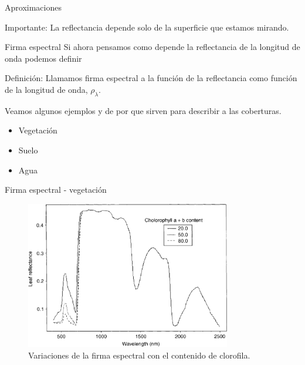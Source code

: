 \documentclass[handout]{beamer}
\begin{document}
\begin{frame}{Aproximaciones}
  \begin{alertblock}{Importante:}
    La reflectancia depende solo de la superficie que estamos mirando.
  \end{alertblock}
\end{frame}

\begin{frame}{Firma espectral}
  Si ahora pensamos como depende la reflectancia de la longitud de onda podemos definir
  \begin{block}{Definición:}
    Llamamos firma espectral a la función de la reflectancia como función de la longitud de onda, $\rho_\lambda$.
  \end{block}\pause
  Veamos algunos ejemplos y de por que sirven para describir a las coberturas.\pause
  \begin{itemize}
    \item Vegetación
    \item Suelo
    \item Agua
  \end{itemize}
\end{frame}


\begin{frame}{Firma espectral - vegetación}
  \begin{figure}
  \centering
  \includegraphics[width=0.8\textwidth]{imagenes/clorovar.png}
  \caption{Variaciones de la firma espectral con el contenido de clorofila.}
  \end{figure}
\end{frame}
\end{document}
